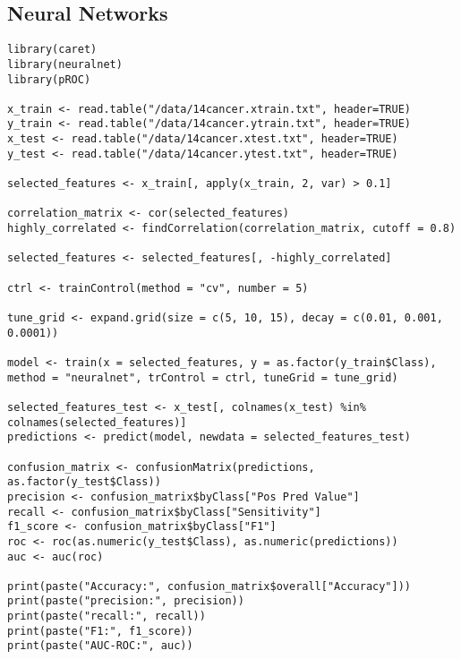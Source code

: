 \documentclass{article}
\begin{document}
\subsection{Neural Networks}
\begin{lstlisting}
library(caret)
library(neuralnet)
library(pROC)

x_train <- read.table("/data/14cancer.xtrain.txt", header=TRUE)
y_train <- read.table("/data/14cancer.ytrain.txt", header=TRUE)
x_test <- read.table("/data/14cancer.xtest.txt", header=TRUE)
y_test <- read.table("/data/14cancer.ytest.txt", header=TRUE)

selected_features <- x_train[, apply(x_train, 2, var) > 0.1]

correlation_matrix <- cor(selected_features)
highly_correlated <- findCorrelation(correlation_matrix, cutoff = 0.8)

selected_features <- selected_features[, -highly_correlated]

ctrl <- trainControl(method = "cv", number = 5)

tune_grid <- expand.grid(size = c(5, 10, 15), decay = c(0.01, 0.001, 0.0001))

model <- train(x = selected_features, y = as.factor(y_train$Class), method = "neuralnet", trControl = ctrl, tuneGrid = tune_grid)

selected_features_test <- x_test[, colnames(x_test) %in% colnames(selected_features)]
predictions <- predict(model, newdata = selected_features_test)

confusion_matrix <- confusionMatrix(predictions, as.factor(y_test$Class))
precision <- confusion_matrix$byClass["Pos Pred Value"]
recall <- confusion_matrix$byClass["Sensitivity"]
f1_score <- confusion_matrix$byClass["F1"]
roc <- roc(as.numeric(y_test$Class), as.numeric(predictions))
auc <- auc(roc)

print(paste("Accuracy:", confusion_matrix$overall["Accuracy"]))
print(paste("precision:", precision))
print(paste("recall:", recall))
print(paste("F1:", f1_score))
print(paste("AUC-ROC:", auc))
\end{lstlisting}
\newpage
\end{document}
